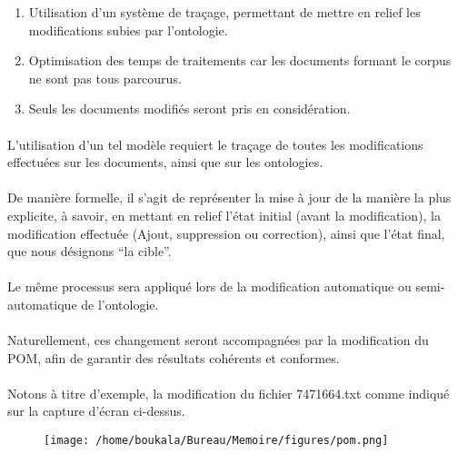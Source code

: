 \documentclass[12pt, a4paper, oneside]{book}
\begin{document}
\begin{enumerate}
\item Utilisation d'un système de traçage, permettant de mettre en relief les modifications subies par l'ontologie.\\
\item Optimisation des temps de traitements car les documents formant le corpus ne sont pas tous parcourus.\\ \item Seuls les documents modifiés seront pris en considération.\\
\end{enumerate}
\paragraph{}
L'utilisation d'un tel modèle requiert le traçage de toutes les modifications effectuées sur les documents, ainsi que sur les ontologies.
\paragraph{}
De manière formelle, il s'agit de représenter la mise à jour de la manière la plus explicite, à savoir, en mettant en relief l'état initial (avant la modification), la modification effectuée (Ajout, suppression ou correction), ainsi que l'état final, que nous désignons “la cible”.
\paragraph{}
Le même processus sera appliqué lors de la modification automatique ou semi-automatique de l'ontologie.
\paragraph{}
Naturellement, ces changement seront accompagnées par la modification du POM, afin de garantir des résultats cohérents et conformes.

\paragraph{}
Notons à titre d'exemple, la modification du fichier 7471664.txt comme indiqué sur la capture d'écran ci-dessus.\\


\begin{figure}[h!]
\begin{center}
\texttt{[image: /home/boukala/Bureau/Memoire/figures/pom.png]}
\end{center}
\end{figure}
\end{document}
